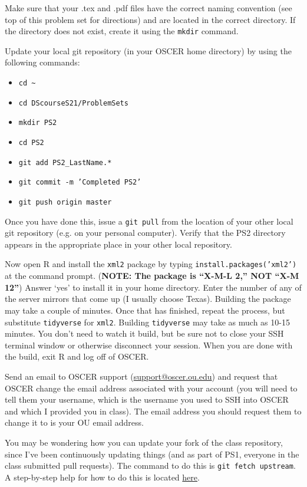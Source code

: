 \documentclass[12pt,english]{exam}
\begin{document}
\begin{questions}
\question Make sure that your .tex and .pdf files have the correct naming convention (see top of this problem set for directions) and are located in the correct directory. If the directory does not exist, create it using the \texttt{mkdir} command.

\question Update your local git repository (in your OSCER home directory) by using the following commands:
\begin{itemize}
	\item \texttt{cd \~}
	\item \texttt{cd DScourseS21/ProblemSets}
	\item \texttt{mkdir PS2}
	\item \texttt{cd PS2}
	\item \texttt{git add PS2\_LastName.*}
	\item \texttt{git commit -m 'Completed PS2'}
	\item \texttt{git push origin master}
\end{itemize}
Once you have done this, issue a \texttt{git pull} from the location of your other local git repository (e.g. on your personal computer). Verify that the PS2 directory appears in the appropriate place in your other local repository.

\question Now open R and install the \texttt{xml2} package by typing \texttt{install.packages('xml2')} at the command prompt. (\textbf{NOTE: The package is ``X-M-L 2,'' NOT ``X-M 12''}) Answer `yes' to install it in your home directory. Enter the number of any of the server mirrors that come up (I usually choose Texas). Building the package may take a couple of minutes. Once that has finished, repeat the process, but substitute \texttt{tidyverse} for \texttt{xml2}. Building \texttt{tidyverse} may take as much as 10-15 minutes. You don't need to watch it build, but be sure not to close your SSH terminal window or otherwise disconnect your session. When you are done with the build, exit R and log off of OSCER.

\question Send an email to OSCER support (\href{mailto:support@oscer.ou.edu}{support@oscer.ou.edu}) and request that OSCER change the email address associated with your account (you will need to tell them your username, which is the username you used to SSH into OSCER and which I provided you in class). The email address you should request them to change it to is your OU email address.

\question You may be wondering how you can update your fork of the class repository, since I've been continuously updating things (and as part of PS1, everyone in the class submitted pull requests). The command to do this is \texttt{git fetch upstream}. A step-by-step help for how to do this is located \href{https://help.github.com/articles/syncing-a-fork/}{here}.

\end{questions}
\end{document}
